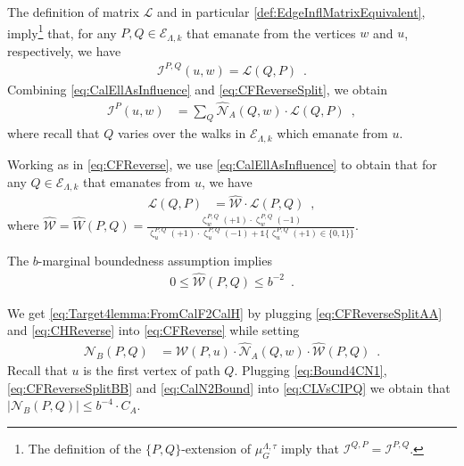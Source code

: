 \documentclass[11pt,reqno]{amsart}
\numberwithin{equation}{section}
\newcommand{\cE}{{\mathcal{E}}}
\newcommand{\cI}{{\mathcal{I}}}
\newcommand{\cL}{{\mathcal{L}}}
\newcommand{\cN}{{\mathcal{N}}}
\newcommand{\cW}{{\mathcal{W}}}
\newcommand{\amethyst}[1]{{\color{amethyst}#1} }
\newcommand{\blue}[1]{{\color{blue}#1}}
\newcommand{\bluepigment}[1]{{\color{blue(pigment)}#1}}
\newcommand{\goldenbrown}[1]{{\color{goldenbrown}#1}}
\newcommand{\iris}[1]{{\color{iris}#1}}
\newcommand{\red}[1]{{\color{red}#1}}
\newcommand{\rosegold}[1]{{\color{rosegold}#1}}
\newcommand{\Ind}{\mathds{1}}
\newcommand{\ExtV}{\iris{\cE}}
\newcommand{\infmatrix}{\cI}
\renewcommand{\amethyst}[1]{#1}
\renewcommand{\blue}[1]{#1}
\renewcommand{\bluepigment}[1]{#1}
\renewcommand{\goldenbrown}[1]{#1}
\renewcommand{\iris}[1]{#1}
\renewcommand{\red}[1]{#1}
\renewcommand{\rosegold}[1]{#1}
\newcommand{\kk}{\bluepigment{k}}
\newcommand{\kP}{\goldenbrown{P}}
\newcommand{\kQ}{\amethyst{Q}}
\newcommand{\ku}{\red{u}}
\newcommand{\kw}{\blue{w}}
\renewcommand{\kk}{k}
\renewcommand{\kP}{P}
\renewcommand{\kQ}{Q}
\renewcommand{\ku}{u}
\renewcommand{\kw}{w}
\newcommand{\ExtdInfMatrix}{\rosegold{\cL}}
\newcommand{\SymWeightM}{\cN}
\newcommand{\SymWeightMB}{\cN_B}
\begin{document}
The definition of matrix $\ExtdInfMatrix$ and in particular \eqref{def:EdgeInflMatrixEquivalent}, imply\footnote{The definition of the $\{P,Q\}$-extension of 
$\mu^{\Lambda,\tau}_G$ imply that $\infmatrix^{\kQ,\kP}=\infmatrix^{\kP,\kQ}$.} that, 
for any $\kP, \kQ\in \ExtV_{\Lambda,\kk}$ that emanate from the vertices $\kw$ and $\ku$, respectively, we have
\begin{align}\label{eq:CalEllAsInfluence}
\infmatrix^{\kP,\kQ} (\ku, \kw)= \ExtdInfMatrix(\kQ,\kP)\enspace.
\end{align}
Combining \eqref{eq:CalEllAsInfluence} and \eqref{eq:CFReverseSplit}, we obtain 
\begin{align}\label{eq:CFReverseSplitAA}
\infmatrix^{\kP}(\ku,\kw) &=
\sum\nolimits_{\kQ} \widehat{\SymWeightM}_A(\kQ, \kw) \cdot \ExtdInfMatrix(\kQ,\kP)\enspace,
\end{align}
where recall that $\kQ$ varies over the walks in $\ExtV_{\Lambda,\kk}$ which emanate from $\ku$. 


Working as in \eqref{eq:CFReverse}, we use \eqref{eq:CalEllAsInfluence} to obtain that 
for any $\kQ\in \ExtV_{\Lambda,\kk}$ that emanates from $\ku$, we have
\begin{align}\label{eq:CHReverse} 
\ExtdInfMatrix(\kQ, \kP) &=
\widehat{\cW} \cdot \ExtdInfMatrix(\kP,\kQ)\enspace, 
\end{align}
where $\widehat{\cW}=\widehat{W}(\kP,\kQ)=\frac{\upzeta^{\kP,\kQ}_{\kw}(+1)\cdot \upzeta^{\kP,\kQ}_{\kw}(-1)} 
{\upzeta^{\kP,\kQ}_{\ku}(+1)\cdot \upzeta^{\kP,\kQ}_{\ku}(-1 )+\Ind\{\upzeta^{\kP,\kQ}_{\ku}(+1)\in \{0,1\}\}}$.

The $b$-marginal boundedness assumption implies 
\begin{align}\label{eq:CalN2Bound}
0\leq \widehat{\cW}(\kP,\kQ) \leq b^{-2}\enspace.
\end{align}


We get \eqref{eq:Target4lemma:FromCalF2CalH} by 
plugging \eqref{eq:CFReverseSplitAA} and \eqref{eq:CHReverse} into \eqref{eq:CFReverse} while setting 
\begin{align}\label{eq:CLVsCIPQ}
\SymWeightMB(\kP, \kQ) &=\cW(\kP,\ku) \cdot \widehat{\SymWeightM}_A(\kQ,\kw) \cdot \widehat{\cW}(\kP, \kQ)\enspace.
\end{align}
Recall that $\ku$ is the first vertex of path $\kQ$. 
%
Plugging \eqref{eq:Bound4CN1}, \eqref{eq:CFReverseSplitBB} and \eqref{eq:CalN2Bound}
into \eqref{eq:CLVsCIPQ} we obtain that $|\SymWeightMB(\kP, \kQ)| \leq b^{-4}\cdot C_A$.
\end{document}
